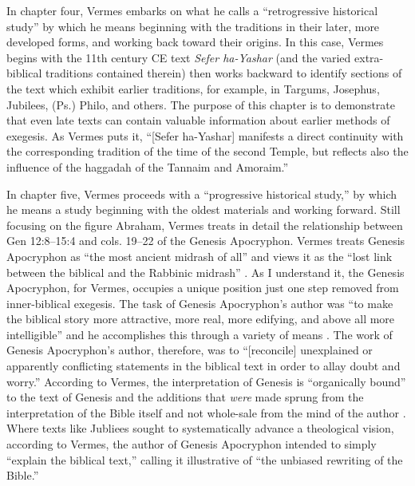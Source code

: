 In chapter four, Vermes embarks on what he calls a ``retrogressive
historical study'' by which he means beginning with the traditions in
their later, more developed forms, and working back toward their
origins. In this case, Vermes begins with the 11th century CE text
\emph{Sefer ha-Yashar} (and the varied extra-biblical traditions
contained therein) then works backward to identify sections of the text
which exhibit earlier traditions, for example, in Targums, Josephus,
Jubilees, (Ps.) Philo, and others. The purpose of this chapter is to
demonstrate that even late texts can contain valuable information about
earlier methods of exegesis. As Vermes puts it, ``{[}Sefer ha-Yashar{]}
manifests a direct continuity with the corresponding tradition of the
time of the second Temple, but reflects also the influence of the
haggadah of the Tannaim and Amoraim.''\autocite[95]{vermes1961}

In chapter five, Vermes proceeds with a ``progressive historical
study,'' by which he means a study beginning with the oldest materials
and working forward. Still focusing on the figure Abraham, Vermes treats
in detail the relationship between Gen 12:8--15:4 and cols. 19--22 of
the Genesis Apocryphon. Vermes treats Genesis Apocryphon as ``the most
ancient midrash of all''\autocite[124]{vermes1961} and views it as the
``lost link between the biblical and the Rabbinic midrash''
\autocite[124]{vermes1961}. As I understand it, the Genesis Apocryphon,
for Vermes, occupies a unique position just one step removed from
inner-biblical exegesis. The task of Genesis Apocryphon's author was
``to make the biblical story more attractive, more real, more edifying,
and above all more intelligible'' and he accomplishes this through a
variety of means \autocite[125]{vermes1961}. The work of
Genesis Apocryphon's author, therefore, was to ``{[}reconcile{]}
unexplained or apparently conflicting statements in the biblical text in
order to allay doubt and worry.''\autocite[125]{vermes1961} According to
Vermes, the interpretation of Genesis is ``organically bound'' to the
text of Genesis and the additions that \emph{were} made sprung from the
interpretation of the Bible itself and not whole-sale from the mind of
the author \autocite[126]{vermes1961}. Where texts like Jubliees sought
to systematically advance a theological vision, according to Vermes, the
author of Genesis Apocryphon intended to simply ``explain the biblical
text,'' calling it illustrative of ``the unbiased rewriting of the
Bible.''\autocite[126]{vermes1961}

